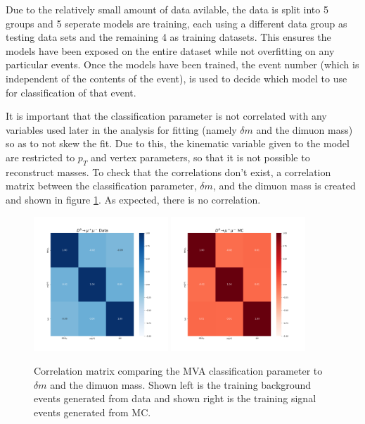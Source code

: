 Due to the relatively small amount of data avilable, the data is split into 5 groups and 5 seperate models are training, each using a different data group as testing data sets and the remaining 4 as training datasets. This ensures the models have been exposed on the entire dataset while not overfitting on any particular events. Once the models have been trained, the event number (which is independent of the contents of the event), is used to decide which model to use for classification of that event. 

It is important that the classification parameter is not correlated with any variables used later in the analysis for fitting (namely $\delta m$ and the dimuon mass) so as to not skew the fit. Due to this, the kinematic variable given to the model are restricted to $p_T$ and vertex parameters, so that it is not possible to reconstruct masses. To check that the correlations don't exist, a correlation matrix between the classification parameter, $\delta m$, and the dimuon mass is created and shown in figure \ref{fig:mva_correlation_matrix_for_fit_variables}. As expected, there is no correlation.


\begin{figure}[htp]
    \begin{center}
      \includegraphics[width=0.45\textwidth]{figures/chapter4/mva/Correlation_data_obs.png}
      \includegraphics[width=0.45\textwidth]{figures/chapter4/mva/Correlation_dmm_obs.png}\\
    \end{center}
    \caption{
      Correlation matrix comparing the MVA classification parameter to $\delta m$ and the dimuon mass. Shown left is the training background events generated from data and shown right is the training signal events generated from MC.
    }
    \label{fig:mva_correlation_matrix_for_fit_variables}
\end{figure}

